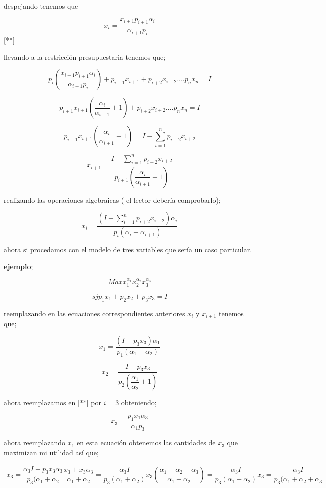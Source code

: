 \documentclass[12pt]{article}
\begin{document}
despejando tenemos que 

$$x_{i}=\dfrac{x_{i+1} p_{i+1} \alpha_{i}}{\alpha_{i+1} p_{i} }$$ [**]

llevando a la restricción presupuestaria tenemos que; 

$$p_{i} \left(\dfrac{x_{i+1} p_{i+1} \alpha_{i}}{\alpha_{i+1} p_{i} } \right)+ p_{i+1} x_{i+1}+ p_{i+2}x_{i+2} .... p_{n}x_{n} = I$$


$$p_{i+1} x_{i+1} \left( \dfrac{\alpha_{i}}{\alpha_{i+1}} +1 \right) + p_{i+2}x_{i+2} .... p_{n}x_{n} = I$$

$$ p_{i+1} x_{i+1} \left( \dfrac{\alpha_{i}}{\alpha_{i+1}} +1 \right) = I - \sum_{i=1}^{n}p_{i+2}x_{i+2}$$

$$x_{i+1}=\dfrac{I - \sum_{i=1}^{n}p_{i+2}x_{i+2}}{p_{i+1}  \left(  \dfrac{\alpha_{i}}{\alpha_{i+1}} +1 \right) }$$

realizando las operaciones algebraicas ( el lector debería comprobarlo); 

$$x_{i}= \dfrac{(I- \sum_{i=1}^{n}p_{i+2}x_{i+2}) \alpha_{i}}{p_{i}(\alpha_{i}+ \alpha_{i+1})}$$

ahora si procedamos con el modelo de tres variables que sería un caso particular. 

\textbf{ejemplo};


$$ Max  x_{1}^{\alpha_{1}} x_{2}^{\alpha_{2}} x_{3}^{\alpha_{3}}$$

$$sj p_{1}x_{1}+p_{2}x_{2}+p_{3}x_{3}=I$$

reemplazando en las ecuaciones correspondientes anteriores $x_{i}$ y $x_{i+1}$ tenemos que;



$$x_{1}= \dfrac{(I-p_{3}x_{3})\alpha_{1}}{p_{1}(\alpha_{1} + \alpha_{2})}$$

$$x_{2}= \dfrac{I - p_{3} x_{3}}{p_{2}  (\dfrac{ \alpha_{1}}{\alpha_{2}} +1) } $$

ahora reemplazamos  en [**] por $i=3$ obteniendo;

$$x_{3}= \dfrac{p_{1}x_{1}\alpha_{3}}{\alpha_{1} p_{3}}$$

ahora reemplazando $x_{1}$ en esta ecuación obtenemos las cantidades de $x_{3}$ que maximizan mi utilidad así que; 

\begin{eqnarray}

x_{3}= \dfrac{\alpha_{3}I - p_{3}x_{3} \alpha_{3}}{p_{3} (\alpha_{1} + \alpha_{2}}

\dfrac{ x_{3}+x_{3}\alpha_{3}}{\alpha_{1} + \alpha _{2}} = \dfrac{\alpha_{3}I}{p_{3}(\alpha_{1}+\alpha_{2})}

x_{3} (\dfrac{\alpha_{1}+\alpha_{2}+\alpha_{3}}{\alpha_{1}+\alpha_{2}}) = \dfrac{\alpha_{3}I}{p_{3}(\alpha_{1}+\alpha_{2})}


x_{3}= \dfrac{\alpha_{3}I}{p_{3}(\alpha_{1}+ \alpha_{2}+\alpha_{3}}



\end{eqnarray}
\end{document}
